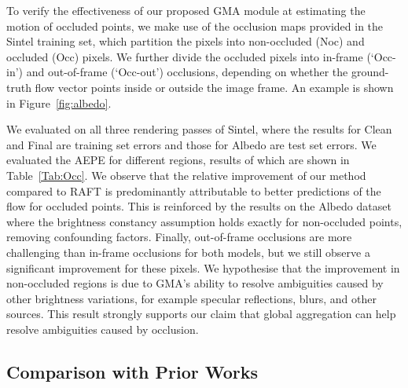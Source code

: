 \documentclass[10pt,twocolumn,letterpaper]{article}
\begin{document}
To verify the effectiveness of our proposed GMA module at estimating the motion of occluded points,
we make use of the occlusion maps provided in the Sintel training set, which partition the pixels into non-occluded (Noc) and occluded (Occ) pixels. We further divide the occluded pixels into in-frame
(`Occ-in') and out-of-frame (`Occ-out') occlusions, depending on whether the 
ground-truth flow vector points inside or outside the image frame.
An example is shown in Figure~\ref{fig:albedo}.

We evaluated on all three rendering passes of Sintel, where the results for Clean and Final are training set errors and those for Albedo are test set errors. 
We evaluated the AEPE for different regions, results of which are shown in Table~\ref{Tab:Occ}.
We observe that the relative improvement of our method compared to RAFT is predominantly 
attributable to better predictions of the flow for occluded points. 
This is reinforced by the results on the Albedo dataset where the brightness constancy assumption holds exactly for non-occluded points, removing confounding factors.
Finally, out-of-frame occlusions are more challenging than in-frame occlusions for both models, but we still observe a significant improvement for these pixels.
We hypothesise that the improvement in non-occluded regions is due to GMA's ability to resolve ambiguities
caused by other brightness variations, for example specular reflections, blurs, and other sources.
This result strongly supports our claim that global aggregation can help resolve ambiguities caused by occlusion. 

\subsection{Comparison with Prior Works}
\label{Sec:quantitative}
\end{document}

